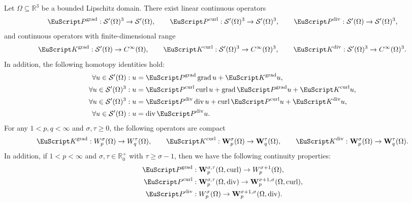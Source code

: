 \documentclass[10pt,a4paper]{amsart}
\theoremstyle{definition}
\theoremstyle{remark}
\numberwithin{equation}{section}
\newcommand{\bbR}{{\mathbb R}}
\newcommand{\bfW}{{\mathbf W}}
\newcommand{\calS}{{\mathcal S}}
\newcommand{\euK}{{\EuScript K}}
\newcommand{\euP}{{\EuScript P}}
\newcommand{\Domain}{{\Omega}}
\newcommand{\Poincare}{\euP}
\newcommand{\Defect}{\euK}
\newcommand{\grad}{\operatorname{grad}}
\newcommand{\curl}{\operatorname{curl}}
\newcommand{\divergence}{\operatorname{div}}
\begin{document}
\begin{theorem}
    Let $\Domain \subseteq \bbR^{3}$ be a bounded Lipschitz domain.
    There exist linear continuous operators
    \begin{align*}
        \Poincare^{\grad} : \calS'(\Domain)^{3} \to \calS'(\Domain)
        ,
        \qquad
        \Poincare^{\curl} : \calS'(\Domain)^{3} \to \calS'(\Domain)^{3}
        ,
        \qquad
        \Poincare^{\divergence} : \calS'(\Domain) \to \calS'(\Domain)^{3}
        ,
    \end{align*}
    and continuous operators with finite-dimensional range 
    \begin{gather*}
        \Defect^{\grad} : \calS'(\Domain) \to C^{\infty}(\Domain)
        ,
        \qquad
        \Defect^{\curl} : \calS'(\Domain)^{3} \to C^{\infty}(\Domain)^{3}
        ,
        \qquad 
        \Defect^{\divergence} : \calS'(\Domain)^{3} \to C^{\infty}(\Domain)^{3}
        .
\end{gather*}
    In addition, the following homotopy identities hold:
    \begin{align*}
        \forall u \in \calS'(\Domain) 
        &:
        u = \Poincare^{\grad} \grad u + \Defect^{\grad} u,
        \\
        \forall u \in \calS'(\Domain)^{3} 
        &:
        u = \Poincare^{\curl} \curl u + \grad \Poincare^{\grad} u + \Defect^{\curl} u,
        \\
        \forall u \in \calS'(\Domain)^{3} 
        &:
        u = \Poincare^{\divergence} \divergence u + \curl \Poincare^{\curl} u + \Defect^{\divergence} u,
        \\
        \forall u \in \calS'(\Domain) 
        &:
        u = \divergence \Poincare^{\divergence} u
        .
    \end{align*}
    For any $1 < p,q < \infty$ and $\sigma, \tau \geq 0$, the following operators are compact 
    \begin{gather*}
        \Defect^{\grad} : W^{\sigma}_{p}(\Domain) \to W^{\tau}_{q}(\Domain)
        ,
        \qquad 
        \Defect^{\curl} : \bfW^{\sigma}_{p}(\Domain) \to \bfW^{\tau}_{q}(\Domain)
        ,
        \qquad  
        \Defect^{\divergence} : \bfW^{\sigma}_{p}(\Domain) \to \bfW^{\tau}_{q}(\Domain)
        .
\end{gather*}
    In addition, if $1 < p < \infty$ and $\sigma, \tau \in \bbR_{0}^{+}$ with $\tau \geq \sigma-1$, then we have the following continuity properties:
    \begin{align*}
        \Poincare^{\grad} &: \bfW^{\sigma,\tau}_{p}(\Domain,\curl) \to W^{\sigma+1}_{p}(\Domain),
        \\
        \Poincare^{\curl} &: \bfW^{\sigma,\tau}_{p}(\Domain,\divergence) \to \bfW^{\sigma+1,\sigma}_{p}(\Domain,\curl),
        \\
        \Poincare^{\divergence} &: W^{\sigma}_{p}(\Domain) \to \bfW^{\sigma+1,\sigma}_{p}(\Domain,\divergence)
        .
    \end{align*}
\end{theorem}
\end{document}
